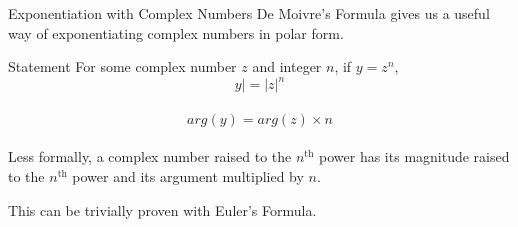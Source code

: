 \begin{namedframe}{Exponentiation with Complex Numbers}
	De Moivre's Formula gives us a useful way of exponentiating complex numbers in polar form.
	\begin{block}{Statement}
		For some complex number $z$ and integer $n$, if $y = z^n$, \\ 
		\[y| = |z|^n\] \\
		\[arg(y) = arg(z) \times n\] \\
		Less formally, a complex number raised to the $n^{\text{th}}$ power has its magnitude
		raised to the $n^{\text{th}}$ power and its argument multiplied by $n$.
	\end{block}

	This can be trivially proven with Euler's Formula.
\end{namedframe}

